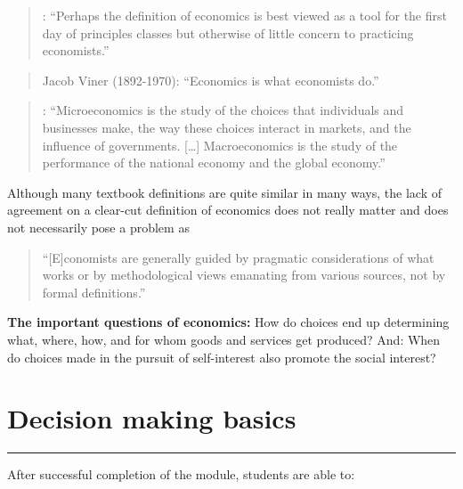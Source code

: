 \documentclass[
  12pt,
  oneside]{book}
\theoremstyle{definition}
\theoremstyle{definition}
\theoremstyle{definition}
\theoremstyle{definition}
\theoremstyle{remark}
\begin{document}
\begin{quote}
\citet[p.~222]{Backhouse2009Retrospectives}: ``Perhaps the definition of economics is best viewed as a tool for the first day of principles classes but otherwise of little concern to practicing economists.''
\end{quote}

\begin{quote}
Jacob Viner (1892-1970): ``Economics is what economists do.'' \citet[p.~222]{Backhouse2009Retrospectives}
\end{quote}

\begin{quote}
\citet[p.~2]{Parkin2012Economics}: ``Microeconomics is the study of the choices that individuals and businesses make, the way these choices interact in markets, and the influence of governments. {[}\ldots{]} Macroeconomics is the study of the performance of the national economy and the global economy.''
\end{quote}

Although many textbook definitions are quite similar in many ways, the
lack of agreement on a clear-cut definition of economics does not really matter and does not necessarily pose a problem as

\begin{quote}
``{[}E{]}conomists are generally guided by pragmatic considerations of what works or by methodological views emanating from various sources, not by formal definitions.'' \citet[p.~231]{Backhouse2009Retrospectives}
\end{quote}

\textbf{The important questions of economics:}
How do choices end up determining what, where, how, and for whom goods and services get produced? And: When do choices made in the pursuit of self-interest also promote the social interest?

\chapter{Decision making basics}\label{decision-making-basics}

\begin{center}\rule{0.5\linewidth}{0.5pt}\end{center}

After successful completion of the module, students are able to:
\end{document}
